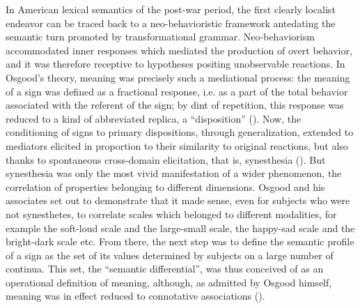 \documentclass[english,output=paper,colorlinks,citecolor=brown]{../langscibook}
\begin{document}
In American lexical semantics of the post-war period, the first clearly localist endeavor can be traced back to a neo-behavioristic framework antedating the semantic turn promoted by transformational grammar. Neo-behaviorism accommodated inner responses which mediated the production of overt behavior, and it was therefore receptive to hypotheses positing unobservable reactions. In Osgood’s theory, meaning was precisely such a mediational process: the meaning of a sign was defined as a fractional response, i.e. as a part of the total behavior associated with the referent of the sign; by dint of repetition, this response was reduced to a kind of abbreviated replica, a “disposition” (\citealt{Osgood1952}). Now, the conditioning of signs to primary dispositions, through generalization, extended to mediators elicited in proportion to their similarity to original reactions, but also thanks to spontaneous cross-domain elicitation, that is, synesthesia (\citealt{KarwoskiEtAl1942}). But synesthesia was only the most vivid manifestation of a wider phenomenon, the correlation of properties belonging to different dimensions. Osgood and his associates set out to demonstrate that it made sense, even for subjects who were not synesthetes, to correlate scales which belonged to different modalities, for example the soft-loud scale and the large-small scale, the happy-sad scale and the bright-dark scale etc. From there, the next step was to define the semantic profile of a sign as the set of its values determined by subjects on a large number of continua. This set, the “semantic differential”, was thus conceived of as an operational definition of meaning, although, as admitted by Osgood himself, meaning was in effect reduced to connotative associations (\citealt[231]{Osgood1952}).
\end{document}
